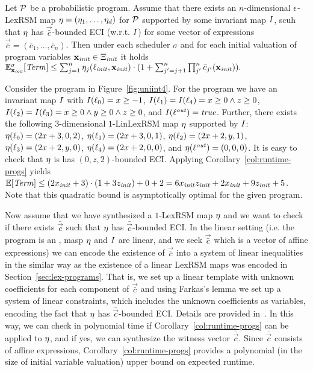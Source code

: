 \begin{corollary}
\label{col:runtime-progs}
Let $\mathcal{P}$ be a probabilistic program. Assume that there exists an 
$n$-dimensional $\epsilon$-LexRSM map $\mathbf{\eta}=(\eta_1,\dots,\eta_d)$ for 
$\mathcal{P}$ supported 
by some 
invariant map $I$, scuh that $\mathbf{\eta}$ has $\vec{\bar{c}}$-bounded ECI 
(w.r.t. $I$) 
for some vector of expressions $\vec{\bar{c}}=(\bar{c}_1,\dots,\bar{c}_n)$. 
Then under each scheduler $\sigma$ and for each initial valuation of program 
variables $\mathbf{x}_{\mathit{init}}\in\Xi_{\mathit{init}}$ it holds $\mathbb{E}^{\sigma}_{\mathbf{x}_{\mathit{init}}}[\mathit{Term}]\leq
\sum_{j=1}^{n}\eta_j(\ell_{\mathit{init}},\mathbf{x}_{\mathit{init}})\cdot(1+\sum_{j'= j+1}^{n}\prod_{j'}^{n} 
\bar{c}_{j'}(\mathbf{x}_{\mathit{init}})).$
\end{corollary}

\begin{example}
Consider the program in Figure~\ref{fig:uniint4}. For the program we have an 
invariant map $I$ with $I(\ell_0)=x\geq -1$, $I(\ell_1)=I(\ell_4) = 
x\geq 0 
\wedge z\geq 0$, $I(\ell_2)=I(\ell_3)= x\geq 0 \wedge y \geq 0
\wedge z\geq 0$, and $I(\ell^{\mathit{out}})=\mathit{true}$. Further, there exists 
the following 
$3$-dimensional 
$1$-LinLexRSM map $\mathbf{\eta}$ supported by $I$: 
$\mathbf{\eta}(\ell_0)=(2x+3,0,2)$, $\mathbf{\eta}(\ell_1)=(2x+3,0,1)$, 
$\mathbf{\eta}(\ell_2)=(2x+2,y,1)$, $\mathbf{\eta}(\ell_3)=(2x+2,y,0)$, 
$\mathbf{\eta}(\ell_4)=(2x+2,0,0)$, and $\mathbf{\eta}(\ell^{\mathit{out}})=(0,0,0)$. It is 
easy to check that $\mathbf{\eta}$ is has $(0,z,2)$-bounded ECI. Applying 
Corollary~\ref{col:runtime-progs} yields $\mathbb{E}[\mathit{Term}]\leq (2x_{\mathit{init}} + 
3)\cdot(1+3z_{\mathit{init}})+0+2= 6x_{\mathit{init}}z_{\mathit{init}} + 
2x_{\mathit{init}} + 9z_{\mathit{init}}+5$. Note that this quadratic bound is 
asymptotically optimal for the given program.
\end{example}

Now assume that we have synthesized a $1$-LexRSM map $\mathbf{\eta}$ and we want 
to check if there exists $\bar{\vec{c}}$ such that $\mathbf{\eta}$ has 
$\bar{\vec{c}}$-bounded ECI. In the linear setting (i.e. the program is an 
\APP{}, masp $\eta$ and $I$ are linear, and we seek $\vec{\bar{c}}$ which is 
a vector of affine expressions) we can encode the existence of $\vec{\bar{c}}$ 
into a system of linear inequalities in the similar way as the existence of a 
linear LexRSM maps was encoded in Section~\ref{sec:lex-programs}. That is, we 
set up a linear template with unknown coefficients for each component of 
$\vec{\bar{c}}$ and using Farkas's lemma we set up a system of linear 
constraints, which includes the unknown coefficients as variables, encoding the 
fact that $\mathbf{\eta}$ has $\bar{\vec{c}}$-bounded ECI. Details are provided 
in~\AppendixMaterial. In this way, we can check in polynomial time if 
Corollary~\ref{col:runtime-progs} can be applied to $\mathbf{\eta}$, and if yes, 
we can synthesize the witness vector $\bar{\vec{c}}$. Since $\bar{\vec{c}}$ 
consists of affine expressions, Corollary~\ref{col:runtime-progs} provides a 
polynomial (in the size of 
initial variable valuation) upper bound on expected runtime.


